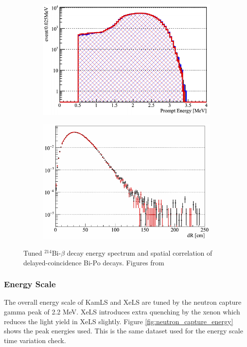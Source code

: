\begin{figure}[htb]
    \centering
    \begin{subfigure}[b]{0.48\textwidth}
        \centering
        \includegraphics[width=\textwidth]{bi214_spec_tune.png}
    \end{subfigure}
    \hfill
    \begin{subfigure}[b]{0.48\textwidth}
        \centering
        \includegraphics[width=\textwidth]{bipo_dR.png}
    \end{subfigure}
    
    \caption{Tuned $^{214}$Bi-$\beta$ decay energy spectrum and spatial correlation of delayed-coincidence Bi-Po decays. Figures from \cite{takeuchi_phd}}
    \label{fig:bipo_tune}
\end{figure}
\subsubsection*{Energy Scale}
The overall energy scale of KamLS and XeLS are tuned by the neutron capture gamma peak of 2.2 MeV. XeLS introduces extra quenching by the xenon which reduces the light yield in XeLS slightly. Figure \ref{fig:neutron_capture_energy} shows the peak energies used. This is the same dataset used for the energy scale time variation check.
